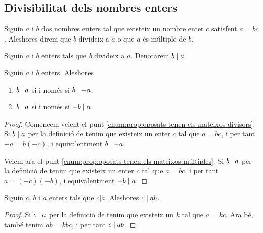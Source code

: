 \documentclass[../Apunts.tex]{subfiles}
\begin{document}
	\subsection{Divisibilitat dels nombres enters}
	\begin{definition}
		\label{def:divisor Z}
		\label{def:múltiple Z}
		Siguin \(a\) i \(b\) dos nombres enters tal que existeix un nombre enter \(c\) satisfent \(a=bc\). Aleshores direm que \(b\) divideix a \(a\) o que \(a\) és múltiple de \(b\).
	\end{definition}
	\begin{notation}
		Siguin \(a\) i \(b\) enters tals que \(b\) divideix a \(a\). Denotarem \(b\mathrel{|} a\).
	\end{notation}
	\begin{proposition}
		\label{prop:oposats tenen els mateixos divisors}
		\label{prop:oposats tenen els mateixos múltiples}
		Siguin \(a\) i \(b\) enters. Aleshores
		\begin{enumerate}
			\item\label{enum:prop:oposats tenen els mateixos divisors} \(b\mathrel{|} a\) si i només si \(b\mathrel{|}-a\).
			\item\label{enum:prop:oposats tenen els mateixos múltiples} \(b\mathrel{|} a\) si i només si \(-b\mathrel{|} a\).
		\end{enumerate}
		\begin{proof}
			Comencem veient el punt \eqref{enum:prop:oposats tenen els mateixos divisors}. Si \(b\mathrel{|} a\) per la definició de  tenim que existeix un enter \(c\) tal que \(a=bc\), i per tant \(-a=b(-c)\), i equivalentment \(b\mathrel{|}-a\).
			
			Veiem ara el punt \eqref{enum:prop:oposats tenen els mateixos múltiples}. Si \(b\mathrel{|} a\) per la definició de  tenim que existeix un enter \(c\) tal que \(a=bc\), i per tant \(a=(-c)(-b)\), i equivalentment \(-b\mathrel{|} a\).
		\end{proof}
	\end{proposition}
	\begin{proposition}
		\label{prop:divisors divideixen el divident escalat}
		Siguin \(c\), \(b\) i \(a\) enters tals que \(c|a\). Aleshores \(c\mathrel{|} ab\).
		\begin{proof}
			Si \(c\mathrel{|} a\) per la definició de  tenim que existeix un \(k\) tal que \(a=kc\). Ara bé, també tenim \(ab=kbc\), i per tant \(c\mathrel{|} ab\).
		\end{proof}
	\end{proposition}
\end{document}
